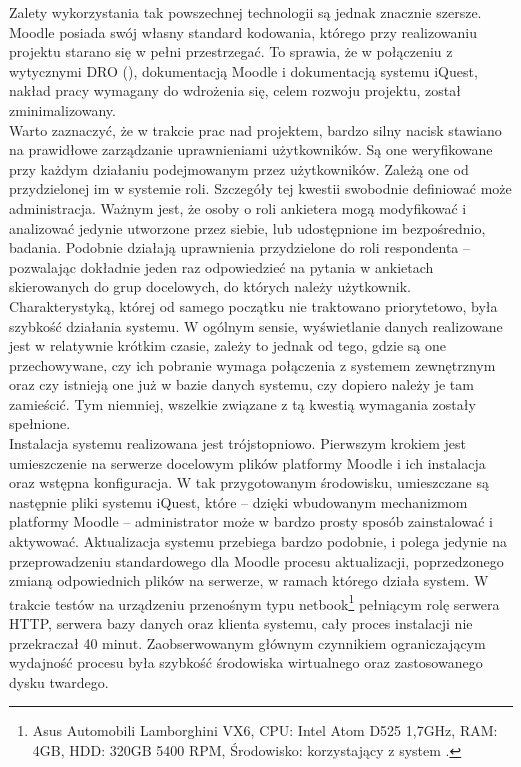 Zalety wykorzystania tak powszechnej technologii są jednak znacznie szersze. Moodle posiada swój własny standard kodowania, którego przy realizowaniu projektu starano się w pełni przestrzegać. To sprawia, że w połączeniu z wytycznymi DRO (), dokumentacją Moodle i dokumentacją systemu iQuest, nakład pracy wymagany do wdrożenia się, celem rozwoju projektu, został zminimalizowany. \\

Warto zaznaczyć, że w trakcie prac nad projektem, bardzo silny nacisk stawiano na prawidłowe zarządzanie uprawnieniami użytkowników. Są one weryfikowane przy każdym działaniu podejmowanym przez użytkowników. Zależą one od przydzielonej im w systemie roli. Szczegóły tej kwestii swobodnie definiować może administracja. Ważnym jest, że osoby o roli ankietera mogą modyfikować i analizować jedynie utworzone przez siebie, lub udostępnione im bezpośrednio, badania. Podobnie działają uprawnienia przydzielone do roli respondenta -- pozwalając dokładnie jeden raz odpowiedzieć na pytania w ankietach skierowanych do grup docelowych, do których należy użytkownik. \\

Charakterystyką, której od samego początku nie traktowano priorytetowo, była szybkość działania systemu. W ogólnym sensie, wyświetlanie danych realizowane jest w relatywnie krótkim czasie, zależy to jednak od tego, gdzie są one przechowywane, czy ich pobranie wymaga połączenia z systemem zewnętrznym oraz czy istnieją one już w bazie danych systemu, czy dopiero należy je tam zamieścić. Tym niemniej, wszelkie związane z tą kwestią wymagania zostały spełnione. \\

Instalacja systemu realizowana jest trójstopniowo. Pierwszym krokiem jest umieszczenie na serwerze docelowym plików platformy Moodle i ich instalacja oraz wstępna konfiguracja. W tak przygotowanym środowisku, umieszczane są następnie pliki systemu iQuest, które -- dzięki wbudowanym mechanizmom platformy Moodle -- administrator może w bardzo prosty sposób zainstalować i aktywować. Aktualizacja systemu przebiega bardzo podobnie, i polega jedynie na przeprowadzeniu standardowego dla Moodle procesu aktualizacji, poprzedzonego zmianą odpowiednich plików na serwerze, w ramach którego działa system. W trakcie testów na urządzeniu przenośnym typu netbook\footnote{Asus Automobili Lamborghini VX6, CPU: Intel Atom D525 1,7GHz, RAM: 4GB, HDD: 320GB 5400 RPM, Środowisko: korzystający z  system .} pełniącym rolę serwera HTTP, serwera bazy danych oraz klienta systemu, cały proces instalacji nie przekraczał 40 minut. Zaobserwowanym głównym czynnikiem ograniczającym wydajność procesu była szybkość środowiska wirtualnego oraz zastosowanego dysku twardego.

